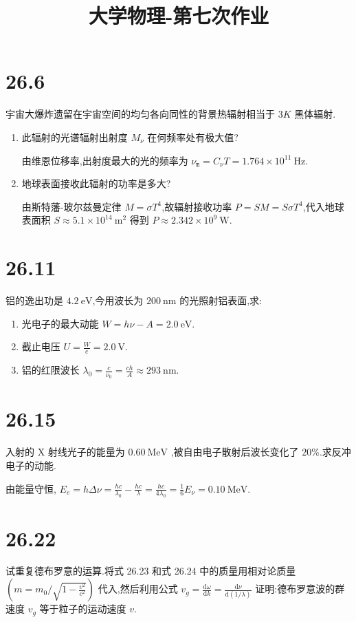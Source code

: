 
\usepackage{../../homeworks_preamble}
\title{大学物理-第七次作业}


    \maketitle
    \section{26.6} 宇宙大爆炸遗留在宇宙空间的均匀各向同性的背景热辐射相当于 $3K$ 黑体辐射.
    \begin{enumerate}
        \item 此辐射的光谱辐射出射度 $M_{\nu}$ 在何频率处有极大值?

            由维恩位移率,出射度最大的光的频率为 $\nu_{\texttt{m}}=C_{\nu}T=1.764\times 10^{11} \ \mathrm{Hz}$.
        \item 地球表面接收此辐射的功率是多大?

            由斯特藩-玻尔兹曼定律 $M=\sigma T^{4}$,故辐射接收功率 $P=SM=S\sigma T^{4}$,代入地球表面积 $S \approx 5.1\times 10^{14} \ \mathrm{m^2}$ 得到 $P\approx 2.342\times 10^{9} \ \mathrm{W}$.
    \end{enumerate}
    \section{26.11} 铝的逸出功是 $4.2 \ \mathrm{eV}$,今用波长为 $200 \ \mathrm{nm}$ 的光照射铝表面,求:
    \begin{enumerate}
        \item 光电子的最大动能 $W=h\nu-A=2.0 \ \mathrm{eV}$.
        \item 截止电压 $U=\frac{W}{e}=2.0 \ \mathrm{V}$.
        \item 铝的红限波长 $\lambda_0=\frac{c}{\nu_0}=\frac{ch}{A}\approx 293 \ \mathrm{nm}$.
    \end{enumerate}
    \section{26.15} 入射的 X 射线光子的能量为 $0.60 \ \mathrm{MeV}$ ,被自由电子散射后波长变化了 $20\%$.求反冲电子的动能.

    由能量守恒, $E_{e}=h\Delta\nu=\frac{hc}{\lambda_0}-\frac{hc}{\lambda}=\frac{hc}{4\lambda_0}=\frac{1}{6}E_{\nu}=0.10 \ \mathrm{MeV}$.
    \section{26.22} 试重复德布罗意的运算.将式 26.23 和式 26.24 中的质量用相对论质量 $\left( m=m_0 / \sqrt{1-\frac{v^2}{c^2}} \right) $ 代入,然后利用公式 $v_{g}=\frac{\mathrm{d}\omega}{\mathrm{d}k}=\frac{\mathrm{d}\nu}{\mathrm{d}\left( 1 / \lambda \right) }$ 证明:德布罗意波的群速度 $v_{g}$ 等于粒子的运动速度 $v$.
    
